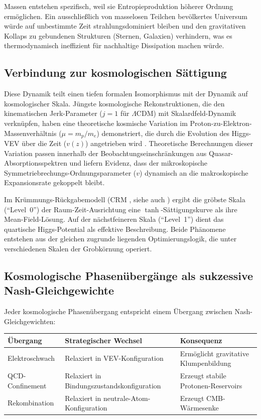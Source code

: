 \documentclass[12pt,a4paper]{article}
\theoremstyle{remark}
\begin{document}
Massen entstehen spezifisch, weil sie Entropieproduktion h\"oherer Ordnung erm\"oglichen. Ein ausschlie\ss{}lich von masselosen Teilchen bev\"olkertes Universum w\"urde auf unbestimmte Zeit strahlungsdominiert bleiben und den gravitativen Kollaps zu gebundenen Strukturen (Sternen, Galaxien) verhindern, was es thermodynamisch ineffizient f\"ur nachhaltige Dissipation machen w\"urde.

\subsection{Verbindung zur kosmologischen S\"attigung}

Diese Dynamik teilt einen tiefen formalen Isomorphismus mit der Dynamik auf kosmologischer Skala. J\"ungste kosmologische Rekonstruktionen, die den kinematischen Jerk-Parameter ($j = 1$ f\"ur $\Lambda$CDM) mit Skalardfeld-Dynamik verkn\"upfen, haben eine theoretische kosmische Variation im Proton-zu-Elektron-Massenverh\"altnis ($\mu = m_p/m_e$) demonstriert, die durch die Evolution des Higgs-VEV \"uber die Zeit ($v(z)$) angetrieben wird \citep{HiggsVEV2024}. Theoretische Berechnungen dieser Variation passen innerhalb der Beobachtungseinschr\"ankungen aus Quasar-Absorptionsspektren und liefern Evidenz, dass der mikroskopische Symmetriebrechungs-Ordnungsparameter ($v$) dynamisch an die makroskopische Expansionsrate gekoppelt bleibt.

Im Kr\"ummungs-R\"uckgabemodell (CRM \cite{GeigerCRM2026}, siehe auch \cite{FST-Unified2026}) ergibt die gr\"obste Skala (``Level~0'') der Raum-Zeit-Ausrichtung eine $\tanh$-S\"attigungskurve als ihre Mean-Field-L\"osung. Auf der n\"achstfeineren Skala (``Level~1'') dient das quartische Higgs-Potential als effektive Beschreibung. Beide Ph\"anomene entstehen aus der gleichen zugrunde liegenden Optimierungslogik, die unter verschiedenen Skalen der Grobk\"ornung operiert.

\subsection{Kosmologische Phasen\"uberg\"ange als sukzessive Nash-Gleichgewichte}

Jeder kosmologische Phasen\"ubergang entspricht einem \"Ubergang zwischen Nash-Gleichgewichten:

\begin{center}
\begin{tabular}{lll}
\toprule
\textbf{\"Ubergang} & \textbf{Strategischer Wechsel} & \textbf{Konsequenz} \\
\midrule
Elektroschwach & Relaxiert in VEV-Konfiguration & Erm\"oglicht gravitative Klumpenbildung \\
QCD-Confinement & Relaxiert in Bindungszustandskonfiguration & Erzeugt stabile Protonen-Reservoirs \\
Rekombination & Relaxiert in neutrale-Atom-Konfiguration & Erzeugt CMB-W\"armesenke \\
\bottomrule
\end{tabular}
\end{center}
\end{document}
